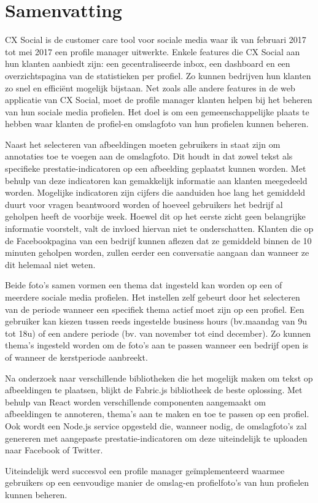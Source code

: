 \chapter{Samenvatting}
\vspace{-3cm}
CX Social is de customer care tool voor sociale media waar ik van februari 2017 tot mei 2017 een profile manager uitwerkte. Enkele features die CX Social aan hun klanten aanbiedt zijn: een gecentraliseerde inbox,  een dashboard en een overzichtspagina van de statistieken per profiel. Zo kunnen bedrijven hun klanten zo snel en efficiënt mogelijk bijstaan. Net zoals alle andere features in de web applicatie van CX Social, moet de profile manager klanten helpen bij het beheren van hun sociale media profielen. Het doel is om een gemeenschappelijke plaats te hebben waar klanten de profiel-en omslagfoto van hun profielen kunnen beheren.

Naast het selecteren van afbeeldingen moeten gebruikers in staat zijn om annotaties toe te voegen aan de omslagfoto. Dit houdt in dat zowel tekst als specifieke prestatie-indicatoren op een afbeelding geplaatst kunnen worden. Met behulp van deze indicatoren kan gemakkelijk informatie aan klanten meegedeeld worden. Mogelijke indicatoren zijn cijfers die aanduiden hoe lang het gemiddeld duurt voor vragen beantwoord worden of hoeveel gebruikers het bedrijf al geholpen heeft de voorbije week. Hoewel dit op het eerste zicht geen belangrijke informatie voorstelt, valt de invloed hiervan niet te onderschatten. Klanten die op de Facebookpagina van een bedrijf kunnen aflezen dat ze gemiddeld binnen de 10 minuten geholpen worden, zullen eerder een conversatie aangaan dan wanneer ze dit helemaal niet weten.

Beide foto's samen vormen een thema dat ingesteld kan worden op een of meerdere sociale media profielen. Het instellen zelf gebeurt door het selecteren van de periode wanneer een specifiek thema actief moet zijn op een profiel. Een gebruiker kan kiezen tussen reeds ingestelde business hours (bv.maandag van 9u tot 18u) of een andere periode (bv. van november tot eind december). Zo kunnen thema's ingesteld worden om de foto's aan te passen wanneer een bedrijf open is of wanneer de kerstperiode aanbreekt. 

Na onderzoek naar verschillende bibliotheken die het mogelijk maken om tekst op afbeeldingen te plaatsen, blijkt de Fabric.js bibliotheek de beste oplossing. Met behulp van React worden verschillende componenten aangemaakt om afbeeldingen te annoteren, thema's aan te maken en toe te passen op een profiel. Ook wordt een Node.js service opgesteld die, wanneer nodig, de omslagfoto's zal genereren met aangepaste prestatie-indicatoren om deze uiteindelijk te uploaden naar Facebook of Twitter. 

Uiteindelijk werd succesvol een profile manager geïmplementeerd waarmee gebruikers op een eenvoudige manier de omslag-en profielfoto's van hun profielen kunnen beheren. 
